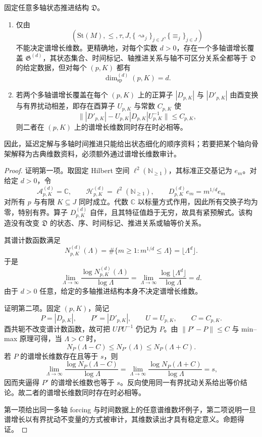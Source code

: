 \begin{proposition}[多轴推进不能替代谱增长审计]\label{distill:connes_spectral_triples_and_chamseddine_connes_spectral_action-commutative_reconstruction_schema-multiaxis-growth-audit}
固定任意多轴状态推进结构 \(\mathfrak D\)。
\begin{enumerate}
  \item 仅由
  \[
  (\mathrm{St}(M),\le,\tau,J,\{\rightsquigarrow_j\}_{j\in J},\{\equiv_j\}_{j\in J})
  \]
  不能决定谱增长维数。更精确地，对每个实数 \(d>0\)，存在一个多轴谱增长覆盖 \(\mathfrak G^{(d)}\)，其状态集合、时间标记、轴推进关系与轴不可区分关系全都等于 \(\mathfrak D\) 的给定数据，但对每个 \((p,K)\) 都有
  \[
  \dim_{\mathrm{sp}}^{(d)}(p,K)=d.
  \]
  \item 若两个多轴谱增长覆盖在每个 \((p,K)\) 上的正算子 \(|D_{p,K}|\) 与 \(|D'_{p,K}|\) 由酉变换与有界扰动相差，即存在酉算子 \(U_{p,K}\) 与常数 \(C_{p,K}\) 使
  \[
  \bigl\||D'_{p,K}|-U_{p,K}|D_{p,K}|U_{p,K}^{-1}\bigr\|\le C_{p,K},
  \]
  则二者在 \((p,K)\) 上的谱增长维数同时存在时必相等。
\end{enumerate}
因此，延迟定解与多轴时间推进只能给出状态细化的顺序资料；若要把某个轴向骨架解释为古典维数资料，必须额外通过谱增长维数审计。
\end{proposition}

\begin{proof}
证明第一项。取固定 Hilbert 空间 \(\ell^2(\mathbb N_{\ge1})\)，其标准正交基记为 \(e_m\)。对给定 \(d>0\)，令
\[
\mathcal A_{p,K}^{(d)}=\mathbb C,\qquad
\mathcal H_{p,K}^{(d)}=\ell^2(\mathbb N_{\ge1}),\qquad
D_{p,K}^{(d)}e_m=m^{1/d}e_m
\]
对所有 \(p\) 与有限 \(K\subseteq J\) 同时成立。代数 \(\mathbb C\) 以标量方式作用，因此所有交换子均为零，特别有界。算子 \(D_{p,K}^{(d)}\) 自伴，且其特征值趋于无穷，故具有紧预解式。该构造没有改变 \(\mathfrak D\) 的状态、序、时间标记、推进关系或轴等价关系。

其谱计数函数满足
\[
N_{p,K}^{(d)}(\Lambda)
=\#\{m\ge1:m^{1/d}\le \Lambda\}
=\lfloor \Lambda^d\rfloor.
\]
于是
\[
\lim_{\Lambda\to\infty}
\frac{\log N_{p,K}^{(d)}(\Lambda)}{\log\Lambda}
=
\lim_{\Lambda\to\infty}
\frac{\log\lfloor \Lambda^d\rfloor}{\log\Lambda}
=d.
\]
由于 \(d>0\) 任意，给定的多轴推进结构本身不决定谱增长维数。

证明第二项。固定 \((p,K)\)，简记
\[
P=|D_{p,K}|,\qquad P'=|D'_{p,K}|,\qquad U=U_{p,K},\qquad C=C_{p,K}.
\]
酉共轭不改变谱计数函数，故可把 \(UPU^{-1}\) 仍记为 \(P\)。由 \(\|P'-P\|\le C\) 与 min--max 原理可得，当 \(\Lambda>C\) 时，
\[
N_P(\Lambda-C)\le N_{P'}(\Lambda)\le N_P(\Lambda+C).
\]
若 \(P\) 的谱增长维数存在且等于 \(s\)，则
\[
\lim_{\Lambda\to\infty}
\frac{\log N_P(\Lambda-C)}{\log\Lambda}
=
\lim_{\Lambda\to\infty}
\frac{\log N_P(\Lambda+C)}{\log\Lambda}
=s,
\]
因而夹逼得 \(P'\) 的谱增长维数也等于 \(s\)。反向使用同一有界扰动关系给出等价结论。故二者的谱增长维数同时存在时必相等。

第一项给出同一多轴 forcing 与时间数据上的任意谱维数坏例子，第二项说明一旦谱增长以有界扰动不变量的方式被审计，其维数读出才具有稳定意义。命题得证。
\end{proof}

